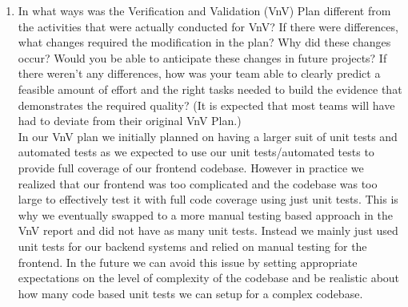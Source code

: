 \documentclass[12pt, titlepage]{article}
\begin{document}
\begin{enumerate}
  \item In what ways was the Verification and Validation (VnV) Plan different
  from the activities that were actually conducted for VnV?  If there were
  differences, what changes required the modification in the plan?  Why did
  these changes occur?  Would you be able to anticipate these changes in future
  projects?  If there weren't any differences, how was your team able to clearly
  predict a feasible amount of effort and the right tasks needed to build the
  evidence that demonstrates the required quality?  (It is expected that most
  teams will have had to deviate from their original VnV Plan.) \\
  In our VnV plan we initially planned on having a larger suit of unit tests and automated tests as we expected to use our unit tests/automated tests to provide full coverage of our frontend codebase. However in practice we realized that our frontend was too complicated and the codebase was too large to effectively test it with full code coverage using just unit tests. This is why we eventually swapped to a more manual testing based approach in the VnV report and did not have as many unit tests. Instead we mainly just used unit tests for our backend systems and relied on manual testing for the frontend. In the future we can avoid this issue by setting appropriate expectations on the level of complexity of the codebase and be realistic about how many code based unit tests we can setup for a complex codebase. 
\end{enumerate}
\end{document}
